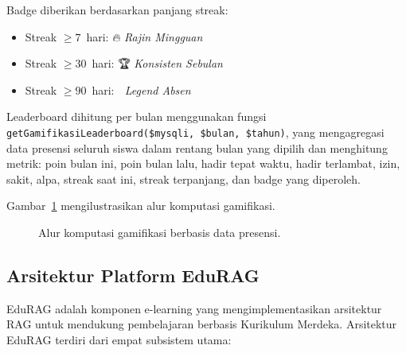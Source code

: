 \documentclass[12pt,a4paper]{article}
\newcommand{\edurag}{EduRAG}
\begin{document}
Badge diberikan berdasarkan panjang streak:
\begin{itemize}
  \item Streak $\geq 7$~hari: 🔥 \textit{Rajin Mingguan}
  \item Streak $\geq 30$~hari: 🏆 \textit{Konsisten Sebulan}
  \item Streak $\geq 90$~hari: 👑 \textit{Legend Absen}
\end{itemize}

Leaderboard dihitung per bulan menggunakan fungsi
\texttt{getGamifikasiLeaderboard(\$mysqli, \$bulan, \$tahun)},
yang mengagregasi data presensi seluruh siswa dalam rentang bulan
yang dipilih dan menghitung metrik: poin bulan ini, poin bulan lalu,
hadir tepat waktu, hadir terlambat, izin, sakit, alpa, streak saat ini,
streak terpanjang, dan badge yang diperoleh.

Gambar~\ref{fig:gamifikasi} mengilustrasikan alur komputasi gamifikasi.

\begin{figure}[htbp]
\centering
{}
\caption{Alur komputasi gamifikasi berbasis data presensi.}
\label{fig:gamifikasi}
\end{figure}

\subsection{Arsitektur Platform \edurag{}}

\edurag{} adalah komponen e-learning yang mengimplementasikan
arsitektur RAG \citep{lewis2020retrieval} untuk mendukung
pembelajaran berbasis Kurikulum Merdeka.
Arsitektur \edurag{} terdiri dari empat subsistem utama:
\end{document}
